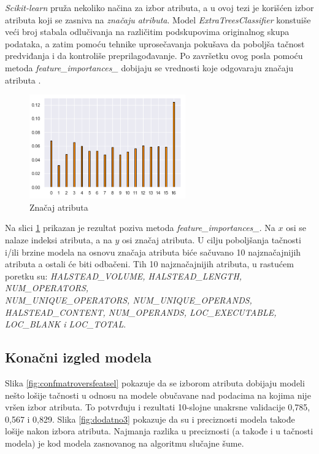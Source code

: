 \documentclass[12pt,oneside]{memoir}
\begin{document}
\textit{Scikit-learn} pruža nekoliko načina za izbor atributa, a u ovoj tezi je korišćen izbor atributa koji se zasniva na \textit{značaju atributa}. Model \textit{ExtraTreesClassifier} konstuiše veći broj stabala odlučivanja na različitim podskupovima originalnog skupa podataka, a zatim pomoću tehnike uprosečavanja pokušava da poboljša tačnost predviđanja i da kontroliše preprilagođavanje. Po završetku ovog posla pomoću metoda \textit{feature\_importances\_} dobijaju se vrednosti koje odgovaraju značaju atributa \cite{scikit-learn}. 

\begin{figure}[!ht]
  \centering
  \includegraphics[width=0.60\textwidth]{izbor_atributa}
  \caption{Značaj atributa}
  \label{fig:znacaj}
\end{figure}

Na slici \ref{fig:znacaj} prikazan je rezultat poziva metoda \textit{feature\_importances\_}. Na $x$ osi se nalaze indeksi atributa, a na $y$ osi značaj atributa. U cilju poboljšanja tačnosti i/ili brzine modela na osnovu značaja atributa biće sačuvano 10 najznačajnijih atributa a ostali će biti odbačeni. Tih 10 najznačajnijih atributa, u rastućem poretku su: \textit{HALSTEAD\_VOLUME, 
HALSTEAD\_LENGTH, 
NUM\_OPERATORS, \\
NUM\_UNIQUE\_OPERATORS, 
NUM\_UNIQUE\_OPERANDS, \\HALSTEAD\_CONTENT, 
NUM\_OPERANDS, LOC\_EXECUTABLE, \\
LOC\_BLANK i LOC\_TOTAL}.

\subsection{Konačni izgled modela}

Slika \ref{fig:confmatroversfeatsel} pokazuje da se izborom atributa dobijaju modeli nešto lošije tačnosti u odnosu na modele obučavane nad podacima na kojima nije vršen izbor atributa. To potvrđuju i rezultati 10-slojne unakrsne validacije 0,785, 0,567 i 0,829. Slika \ref{fig:dodatno3} pokazuje da su i preciznosti modela takođe lošije nakon izbora atributa. Najmanja razlika u preciznosti (a takođe i u tačnosti modela) je kod modela zasnovanog na algoritmu slučajne šume. 
\end{document}
